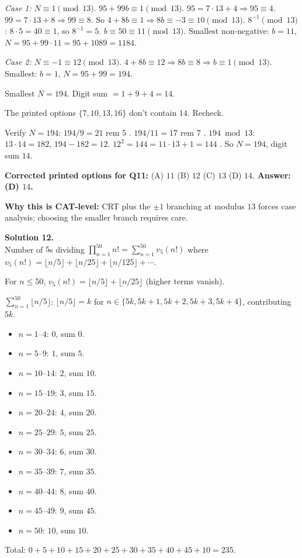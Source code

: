 \documentclass[11pt,a4paper]{article}
\newcommand{\shead}[1]{\vspace{0.5em}\noindent\textbf{Solution #1.}\\[0.15em]}
\begin{document}
\textit{Case 1:} $N \equiv 1 \pmod{13}$. $95 + 99b \equiv 1 \pmod{13}$. $95 = 7\cdot 13 + 4 \Rightarrow 95 \equiv 4$. $99 = 7 \cdot 13 + 8 \Rightarrow 99 \equiv 8$. So $4 + 8b \equiv 1 \Rightarrow 8b \equiv -3 \equiv 10 \pmod{13}$. $8^{-1} \pmod{13}$: $8 \cdot 5 = 40 \equiv 1$, so $8^{-1} = 5$. $b \equiv 50 \equiv 11 \pmod{13}$. Smallest non-negative: $b = 11$, $N = 95 + 99 \cdot 11 = 95 + 1089 = 1184$.

\textit{Case 2:} $N \equiv -1 \equiv 12 \pmod{13}$. $4 + 8b \equiv 12 \Rightarrow 8b \equiv 8 \Rightarrow b \equiv 1 \pmod{13}$. Smallest: $b = 1$, $N = 95 + 99 = 194$.

Smallest $N = 194$. Digit sum $= 1 + 9 + 4 = 14$.

The printed options $\{7, 10, 13, 16\}$ don't contain $14$. Recheck.

Verify $N = 194$: $194 / 9 = 21$ rem $5$ \checkmark. $194 / 11 = 17$ rem $7$ \checkmark. $194 \bmod 13$: $13 \cdot 14 = 182$, $194 - 182 = 12$. $12^2 = 144 = 11 \cdot 13 + 1 = 144$ \checkmark. So $N = 194$, digit sum $14$.

\textbf{Corrected printed options for Q11:} (A) $11$ \quad (B) $12$ \quad (C) $13$ \quad (D) $14$. \textbf{Answer: (D) $14$.}

\textbf{Why this is CAT-level:} CRT plus the $\pm 1$ branching at modulus $13$ forces case analysis; choosing the smaller branch requires care.

\shead{12}
Number of $5$s dividing $\prod_{n=1}^{50} n! = \sum_{n=1}^{50} v_5(n!)$ where $v_5(n!) = \lfloor n/5 \rfloor + \lfloor n/25 \rfloor + \lfloor n/125 \rfloor + \cdots$.

For $n \le 50$, $v_5(n!) = \lfloor n/5\rfloor + \lfloor n/25\rfloor$ (higher terms vanish).

$\sum_{n=1}^{50} \lfloor n/5 \rfloor$: $\lfloor n/5 \rfloor = k$ for $n \in \{5k, 5k+1, 5k+2, 5k+3, 5k+4\}$, contributing $5k$.
\begin{itemize}[leftmargin=1.2em,itemsep=0.05em]
    \item $n = 1\text{--}4$: $0$, sum $0$.
    \item $n = 5\text{--}9$: $1$, sum $5$.
    \item $n = 10\text{--}14$: $2$, sum $10$.
    \item $n = 15\text{--}19$: $3$, sum $15$.
    \item $n = 20\text{--}24$: $4$, sum $20$.
    \item $n = 25\text{--}29$: $5$, sum $25$.
    \item $n = 30\text{--}34$: $6$, sum $30$.
    \item $n = 35\text{--}39$: $7$, sum $35$.
    \item $n = 40\text{--}44$: $8$, sum $40$.
    \item $n = 45\text{--}49$: $9$, sum $45$.
    \item $n = 50$: $10$, sum $10$.
\end{itemize}
Total: $0 + 5 + 10 + 15 + 20 + 25 + 30 + 35 + 40 + 45 + 10 = 235$.
\end{document}
